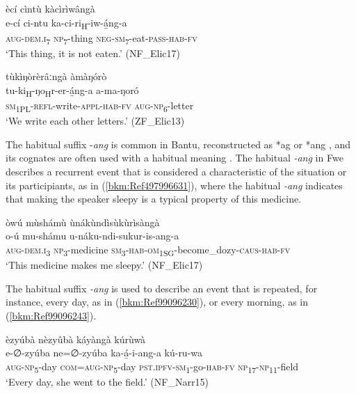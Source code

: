 \ea
\label{bkm:Ref490749889}
ècí cìntù kàcìrìwângà\\
\gll e-cí    ci-ntu    ka-ci-ri\textsubscript{H}-iw-á̲ng-a\\
\textsc{aug}-\textsc{dem}.\textsc{i}\textsubscript{7}  \textsc{np}\textsubscript{7}-thing  \textsc{neg}-\textsc{sm}\textsubscript{7}-eat-\textsc{pass}-\textsc{hab}-\textsc{fv}\\
\glt ‘This thing, it is not eaten.’ (NF\_Elic17)
\z

\ea
\label{bkm:Ref452393178}
tùkìŋòrèrâːngà àmàŋórò\\
\gll tu-ki\textsubscript{H}-ŋo\textsubscript{H}r-er-á̲ng-a    a-ma-ŋoró\\
\textsc{sm}\textsubscript{1PL}-\textsc{refl}-write-\textsc{appl}-\textsc{hab}-\textsc{fv}  \textsc{aug}-\textsc{np}\textsubscript{6}-letter\\
\glt ‘We write each other letters.’ (ZF\_Elic13)
\z

The habitual suffix -\textit{ang} is common in Bantu, reconstructed as *ag or *ang \citep{Meeussen1967}, and its cognates are often used with a habitual meaning \citep[98]{Nurse2008}. The habitual \textit{-ang} in Fwe describes a recurrent event that is considered a characteristic of the situation or its participiants, as in (\ref{bkm:Ref497996631}), where the habitual \textit{-ang} indicates that making the speaker sleepy is a typical property of this medicine.

\ea
\label{bkm:Ref497996631}
òwú mùshámù ùnákùndìsùkùrìsàngà\\
\gll o-ú    mu-shámu    u-náku-ndi-sukur-is-ang-a\\
\textsc{aug}-\textsc{dem}.\textsc{i}\textsubscript{3}  \textsc{np}\textsubscript{3}-medicine  \textsc{sm}\textsubscript{3}-\textsc{hab}-\textsc{om}\textsubscript{1SG}-become\_dozy-\textsc{caus}-\textsc{hab}-\textsc{fv}\\
\glt ‘This medicine makes me sleepy.’ (NF\_Elic17)
\z

The habitual suffix \textit{-ang} is used to describe an event that is repeated, for instance, every day, as in (\ref{bkm:Ref99096230}), or every morning, as in (\ref{bkm:Ref99096243}).

\ea
\label{bkm:Ref99096230}
èzyúbà nèzyûbà káyàngà kúrùwà\\
\gll e-∅-zyúba    ne=∅-zyúba    ka-á̲-i-ang-a      kú-ru-wa\\
\textsc{aug}-\textsc{np}\textsubscript{5}-day  \textsc{com}=\textsc{aug}-\textsc{np}\textsubscript{5}-day  \textsc{pst}.\textsc{ipfv}-\textsc{sm}\textsubscript{1}-go-\textsc{hab}-\textsc{fv}  \textsc{np}\textsubscript{17}-\textsc{np}\textsubscript{11}-field\\
\glt ‘Every day, she went to the field.’ (NF\_Narr15)
\z

